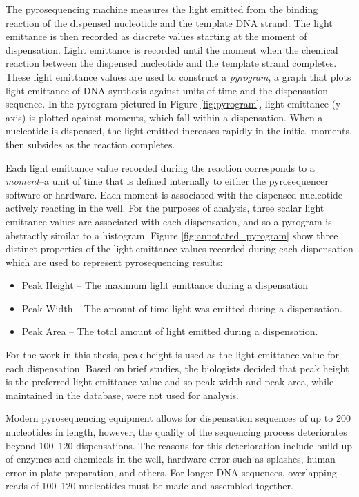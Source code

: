 \documentclass[12pt]{ucthesis}
\begin{document}
      The pyrosequencing machine measures the light emitted from the binding
      reaction of the dispensed nucleotide and the template DNA strand. The
      light emittance is then recorded as discrete values starting at the
      moment of dispensation. Light emittance is recorded until the moment when
      the chemical reaction between the dispensed nucleotide and the template
      strand completes. These light emittance values are used to construct a
      \textit{pyrogram}, a graph that plots light emittance of DNA synthesis
      against units of time and the dispensation sequence. In the pyrogram
      pictured in Figure \ref{fig:pyrogram}, light emittance (y-axis) is
      plotted against moments, which fall within a dispensation. When a
      nucleotide is dispensed, the light emitted increases rapidly in the
      initial moments, then subsides as the reaction completes.

      Each light emittance value recorded during the reaction corresponds to a
      \textit{moment}--a unit of time that is defined internally to either the
      pyrosequencer software or hardware. Each moment is associated with the
      dispensed nucleotide actively reacting in the well. For the purposes of
      analysis, three scalar light emittance values are associated with each
      dispensation, and so a pyrogram is abstractly similar to a histogram.
      Figure \ref{fig:annotated_pyrogram} show three distinct properties of the
      light emittance values recorded during each dispensation which are used
      to represent pyrosequencing results:
      \begin{itemize}
         \item Peak Height -- The maximum light emittance during a dispensation
         \item Peak Width -- The amount of time light was emitted during a
                             dispensation.
         \item Peak Area -- The total amount of light emitted during a
                            dispensation.
      \end{itemize}
      For the work in this thesis, peak height is used as the light emittance
      value for each dispensation. Based on brief studies, the biologists
      decided that peak height is the preferred light emittance value and so
      peak width and peak area, while maintained in the database, were not used
      for analysis.
      
      Modern pyrosequencing equipment allows for dispensation sequences of up
      to 200 nucleotides in length, however, the quality of the sequencing
      process deteriorates beyond 100--120 dispensations. The reasons for this
      deterioration include build up of enzymes and chemicals in the well,
      hardware error such as splashes, human error in plate preparation, and
      others. For longer DNA sequences, overlapping reads of 100--120
      nucleotides must be made and assembled together.
      
\end{document}
